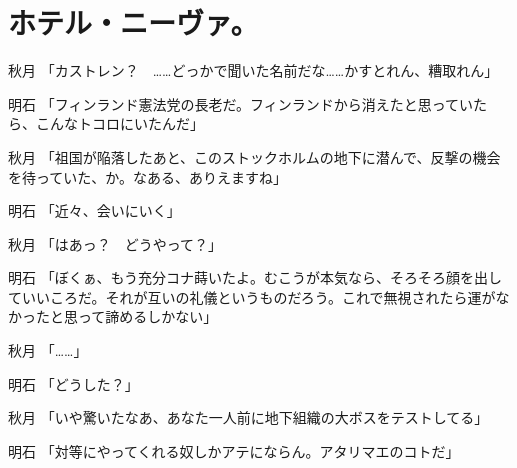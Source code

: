 \section*{ホテル・ニーヴァ。}

秋月	「カストレン？　……どっかで聞いた名前だな……かすとれん、糟取れん」

明石	「フィンランド憲法党の長老だ。フィンランドから消えたと思っていたら、こんなトコロにいたんだ」

秋月	「祖国が陥落したあと、このストックホルムの地下に潜んで、反撃の機会を待っていた、か。なある、ありえますね」

明石	「近々、会いにいく」

秋月	「はあっ？　どうやって？」

明石	「ぼくぁ、もう充分コナ蒔いたよ。むこうが本気なら、そろそろ顔を出していいころだ。それが互いの礼儀というものだろう。これで無視されたら運がなかったと思って諦めるしかない」

秋月	「……」

明石	「どうした？」

秋月	「いや驚いたなあ、あなた一人前に地下組織の大ボスをテストしてる」

明石	「対等にやってくれる奴しかアテにならん。アタリマエのコトだ」
